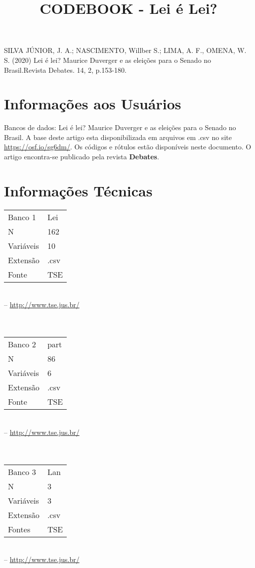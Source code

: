 \documentclass[12pt]{article}
\title{\textbf{CODEBOOK - Lei é Lei?}}
\date{ }
\begin{document}
\maketitle

\noindent SILVA JÚNIOR, J. A.; NASCIMENTO, Willber S.; LIMA, A. F., OMENA, W. S. (2020)  
Lei é lei? Maurice Duverger e as eleições para o Senado no Brasil.Revista Debates. 14, 2, p.153-180.

\tableofcontents
\pagebreak	





	\section{Informações aos Usuários}
	Bancos de dados: Lei é lei? Maurice Duverger e as eleições para o Senado no Brasil.
	A base deste artigo esta disponibilizada em arquivos em .csv no site {\color{red}\url{https://osf.io/sg6dm/}}. Os códigos e rótulos estão disponíveis neste documento. O artigo encontra-se publicado pela revista \textbf{Debates}.
	
	
	\section{Informações Técnicas}
	\begin{tabular}{p{3cm} p{10cm}} 
		Banco 1     & Lei \\
		N           &  162 \\ 
		Variáveis   &  10 \\
		Extensão    & .csv \\  
		Fonte       & TSE  \\  
	\end{tabular} \\
   -- {\color{blue}\url{http://www.tse.jus.br/}}
 \\ \\ \\
	\begin{tabular}{p{3cm} p{10cm}} 
		Banco 2      & part \\
		N           &  86 \\ 
		Variáveis   &  6 \\
		Extensão    & .csv \\  
		Fonte       & TSE 
	\end{tabular} \\ 
-- {\color{blue}\url{http://www.tse.jus.br/}} \\  
\\ \\
	\begin{tabular}{p{3cm} p{10cm}} 
		Banco 3     & Lan \\
		N           &  3 \\ 
		Variáveis   &  3 \\
		Extensão    & .csv \\  
		Fontes      &  TSE 	\end{tabular} \\ 
	-- {\color{blue}\url{http://www.tse.jus.br/}} \\  
\end{document}
